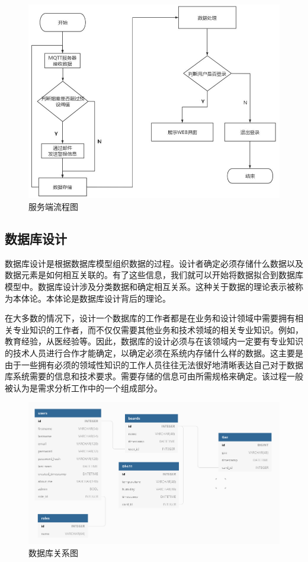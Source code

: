 \begin{figure}[htbp]
	\centering
	\includegraphics[width=0.85\linewidth]{figure/2-6}
	\caption{服务端流程图}
	\label{fig:2-6}
\end{figure}



\subsection{数据库设计}

数据库设计是根据数据库模型组织数据的过程。设计者确定必须存储什么数据以及数据元素是如何相互关联的。有了这些信息，我们就可以开始将数据拟合到数据库模型中。数据库设计涉及分类数据和确定相互关系。这种关于数据的理论表示被称为本体论。本体论是数据库设计背后的理论。

在大多数的情况下，设计一个数据库的工作者都是在业务和设计领域中需要拥有相关专业知识的工作者，而不仅仅需要其他业务和技术领域的相关专业知识。例如，教育经验，从医经验等。因此，数据库的设计必须与在该领域内一定要有专业知识的技术人员进行合作才能确定，以确定必须在系统内存储什么样的数据。这主要是由于一些拥有必须的领域性知识的工作人员往往无法很好地清晰表达自己对于数据库系统需要的信息和技术要求。需要存储的信息可由所需规格来确定。该过程一般被认为是需求分析工作中的一个组成部分。

\begin{figure}[htbp]
	\centering
	\includegraphics[width=1\linewidth]{figure/2-7}
	\caption{数据库关系图}
	\label{fig:2-7}
\end{figure}


